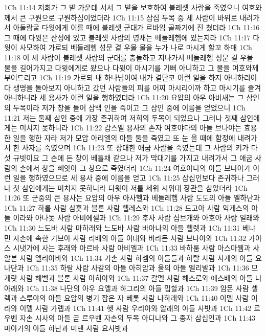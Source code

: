 1Ch 11:14  저희가 그 밭 가운데 서서 그 밭을 보호하여 블레셋 사람을 죽였으니 여호와께서 큰 구원으로 구원하심이었더라
1Ch 11:15  삼십 두목 중 세 사람이 바위로 내려가서 아둘람굴 다윗에게 이를 때에 블레셋 군대가 르바임 골짜기에 진 쳤더라
1Ch 11:16  그 때에 다윗은 산성에 있고 블레셋 사람의 영채는 베들레헴에 있는지라
1Ch 11:17  다윗이 사모하여 가로되 베들레헴 성문 곁 우물 물을 누가 나로 마시게 할꼬 하매
1Ch 11:18  이 세 사람이 블레셋 사람의 군대를 충돌하고 지나가서 베들레헴 성문 곁 우물 물을 길어가지고 다윗에게로 왔으나 다윗이 마시기를 기뻐 아니하고 그 물을 여호와께 부어드리고
1Ch 11:19  가로되 내 하나님이여 내가 결단코 이런 일을 하지 아니하리이다 생명을 돌아보지 아니하고 갔던 사람들의 피를 어찌 마시리이까 하고 마시기를 즐겨 아니하니라 세 용사가 이런 일을 행하였더라
1Ch 11:20  요압의 아우 아비새는 그 삼인의 두목이라 저가 창을 들어 삼백 인을 죽이고 그 삼인 중에 이름을 얻었으니
1Ch 11:21  저는 둘째 삼인 중에 가장 존귀하여 저희의 두목이 되었으나 그러나 첫째 삼인에게는 미치지 못하니라
1Ch 11:22  갑스엘 용사의 손자 여호야다의 아들 브나야는 효용한 일을 행한 자라 저가 모압 아리엘의 아들 둘을 죽였고 또 눈 올 때에 함정에 내려가서 한 사자를 죽였으며
1Ch 11:23  또 장대한 애굽 사람을 죽였는데 그 사람의 키가 다섯 규빗이요 그 손에 든 창이 베틀채 같으나 저가 막대기를 가지고 내려가서 그 애굽 사람의 손에서 창을 빼앗아 그 창으로 죽였더라
1Ch 11:24  여호야다의 아들 브나야가 이런 일을 행하였으므로 세 용사 중에 이름을 얻고
1Ch 11:25  삼십인보다 존귀하나 그러나 첫 삼인에게는 미치지 못하니라 다윗이 저를 세워 시위대 장관을 삼았더라
1Ch 11:26  또 군중의 큰 용사는 요압의 아우 아사헬과 베들레헴 사람 도도의 아들 엘하난과
1Ch 11:27  하롤 사람 삼훗과 블론 사람 헬레스와
1Ch 11:28  드고아 사람 익게스의 아들 이라와 아나돗 사람 아비에셀과
1Ch 11:29  후사 사람 십브개와 아호아 사람 일래와
1Ch 11:30  느도바 사람 마하래와 느도바 사람 바아나의 아들 헬렛과
1Ch 11:31  베냐민 자손에 속한 기브아 사람 리배의 아들 이대와 비라돈 사람 브나야와
1Ch 11:32  가아스 시냇가에 사는 후래와 아르바 사람 아비엘과
1Ch 11:33  바하룸 사람 아스마웹과 사알본 사람 엘리아바와
1Ch 11:34  기손 사람 하셈의 아들들과 하랄 사람 사게의 아들 요나단과
1Ch 11:35  하랄 사람 사갈의 아들 아히암과 울의 아들 엘리발과
1Ch 11:36  므게랏 사람 헤벨과 블론 사람 아히야와
1Ch 11:37  갈멜 사람 헤스로와 에스배의 아들 나아래와
1Ch 11:38  나단의 아우 요엘과 하그리의 아들 밉할과
1Ch 11:39  암몬 사람 셀렉과 스루야의 아들 요압의 병기 잡은 자 베롯 사람 나하래와
1Ch 11:40  이델 사람 이라와 이델 사람 가렙과
1Ch 11:41  헷 사람 우리아와 알래의 아들 사밧과
1Ch 11:42  르우벤 자손 시사의 아들 곧 르우벤 자손의 두목 아디나와 그 종자 삼십인과
1Ch 11:43  마아가의 아들 하난과 미덴 사람 요사밧과
